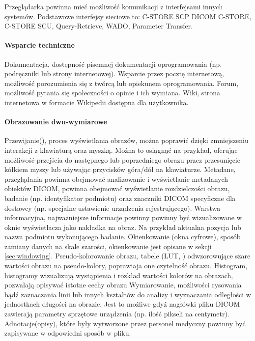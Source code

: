 Przeglądarka powinna mieć możliwość komunikacji z interfejsami innych systemów.
Podstawowe interfejsy sieciowe to: C-STORE SCP DICOM C-STORE, C-STORE SCU, Query-Retrieve, WADO, Parameter Transfer.

\paragraph{Wsparcie techniczne}

Dokumentacja, dostępność pisemnej dokumentacji oprogramowania (np. podręczniki lub strony internetowej).
Wsparcie przez pocztę internetową, możliwość porozumienia się z twórcą lub opiekunem oprogramowania.
Forum, możliwość pytania się społeczności o opinie i ich wymiana.
Wiki, strona internetowa w formacie Wikipedii dostępna dla użytkownika.

\paragraph{Obrazowanie dwu-wymiarowe}

Przewijanie(), proces wyświetlania obrazów, można poprawić dzięki zmniejszeniu interakcji z klawiaturą oraz myszką. Można to osiągnąć na przykład, oferując możliwość przejścia do następnego lub poprzedniego obrazu przez przesunięcie kółkiem myszy lub używając przycisków góra/dół na klawiaturze.
Metadane, przeglądania powinna obejmować analizowanie i wyświetlanie metadanych obiektów DICOM, powinna obejmować wyświetlanie rozdzielczości obrazu, badanie (np. identyfikator podmiotu) oraz znaczniki DICOM specyficzne dla dostawcy (np. specjalne ustawienie urządzenia rejestrującego).
Warstwa informacyjna, najważniejsze informacje powinny powinny być wizualizowane w oknie wyświetlacza jako nakładka na obraz.
Na przykład aktualna pozycja lub nazwa podmiotu wykonującego badanie.
Okienkowanie (okna cyfrowe), sposób zamiany danych na skale szarości, okienkowanie jest opisane w sekcji \ref{sec:windowing}.
Pseudo-kolorowanie obrazu, tabele (LUT, ) odwzorowujące szare wartości obrazu na pseudo-kolory, poprawiaja one czytelność obrazu.
Histogram, histogramy wizualizują wystąpienia i rozkład wartości kolorów na obrazach, pozwalają opisywać istotne cechy obrazu
Wymiarowanie, możliwości rysowania bądź zaznaczania linii lub innych kształtów do analizy i wyznaczania odległości w jednostkach długości na obrazie.
Jest to możliwe gdyż nagłówki pliku DICOM zawierają parametry sprzętowe urządzenia (np. ilość pikseli na centymetr).
Adnotacje(opisy), które były wytworzone przez personel medyczny powinny być zapisywane w odpowiedni sposób w pliku.

